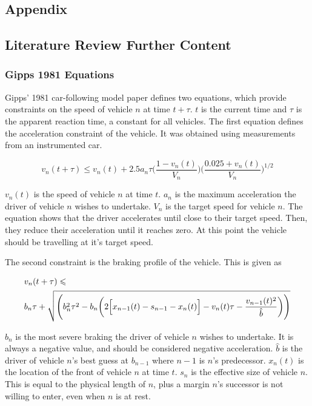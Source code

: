 \begin{appendices}
\chapter{Appendix}
\label{cha:Appendix}

\section{Literature Review Further Content}
\label{sec:Literature Review Further Content}

\subsection{Gipps 1981 Equations}
\label{subsec:Gipps 1981 Equations}
Gipps' 1981 car-following model paper \citep{Gipps1981} defines two equations, which provide constraints on the speed of vehicle $n$ at time $t + \tau$. $t$ is the current time and $\tau$ is the apparent reaction time, a constant for all vehicles. The first equation defines the acceleration constraint of the vehicle. It was obtained using measurements from an instrumented car.

\begin{equation}\label{Gipps1981Accel}
v_n(t+\tau) \leqslant v_n(t) + 2.5a_n\tau\Biggl(\frac{1 - v_n(t)}{V_n}\Biggr)\Biggl(\frac{0.025 + v_n(t)}{V_n}\Biggr)^{1/2}
\end{equation}

$v_n(t)$ is the speed of vehicle $n$ at time $t$. $a_n$ is the maximum acceleration the driver of vehicle $n$ wishes to undertake. $V_n$ is the target speed for vehicle $n$. The equation shows that the driver accelerates until close to their target speed. Then, they reduce their acceleration until it reaches zero. At this point the vehicle should be travelling at it's target speed.

The second constraint is the braking profile of the vehicle. This is given as

\begin{equation}\label{Gipps1981Brake}
\begin{split}
&v_n(t+\tau) \leqslant \\
&b_n\tau + \sqrt{\Biggl(b_n^2\tau^2 - b_n\biggl(2\Bigl[x_{n-1}(t) - s_{n-1} - x_n(t)\Bigr] - v_n(t)\tau - \frac{v_{n-1}(t)^2}{\hat{b}}\biggr)\Biggr)}
\end{split}
\end{equation}

$b_n$ is the most severe braking the driver of vehicle $n$ wishes to undertake. It is always a negative value, and should be considered negative acceleration. $\hat{b}$ is the driver of vehicle $n$'s best guess at $b_{n-1}$ where $n-1$ is $n$'s predecessor. $x_n(t)$ is the location of the front of vehicle $n$ at time $t$. $s_n$ is the effective size of vehicle $n$. This is equal to the physical length of $n$, plus a margin $n$'s successor is not willing to enter, even when $n$ is at rest.


\end{appendices}
